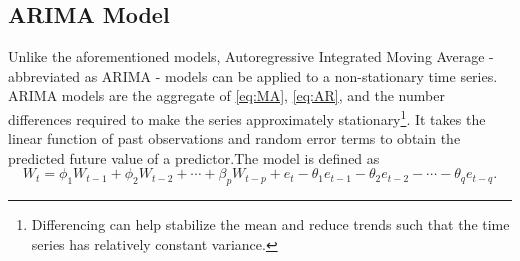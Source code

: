 \documentclass[12pt, centerh1]{article}
\begin{document}
\subsection{ARIMA Model}

Unlike the aforementioned models, Autoregressive Integrated Moving Average - abbreviated as ARIMA - models can be applied to a non-stationary time series. ARIMA models are the aggregate of \eqref{eq:MA}, \eqref{eq:AR}, and the number differences required to make the series approximately stationary\footnote{Differencing can help stabilize the mean and reduce trends such that the time series has relatively constant variance.}. It takes the linear function of past observations and random error terms to obtain the predicted future value of a predictor.The model is defined as
\begin{equation}\label{eq:ARIMA}
        W_t = \phi_1W_{t-1} + \phi_2W_{t-2} + \cdots + \beta_pW_{t-p} + e_t - \theta_1e_{t-1} - \theta_2e_{t-2} - \cdots - \theta_qe_{t-q}. 
\end{equation}
\end{document}
